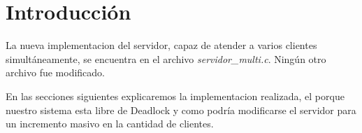 \section{Introducción}

La nueva implementacion del servidor, capaz de atender a varios clientes simultáneamente, se encuentra en el archivo \textit{servidor\_multi.c}.
Ningún otro archivo fue modificado.

En las secciones siguientes explicaremos la implementacion realizada, el porque nuestro sistema esta libre de Deadlock y como podría modificarse el servidor para un incremento masivo en la cantidad de clientes.

